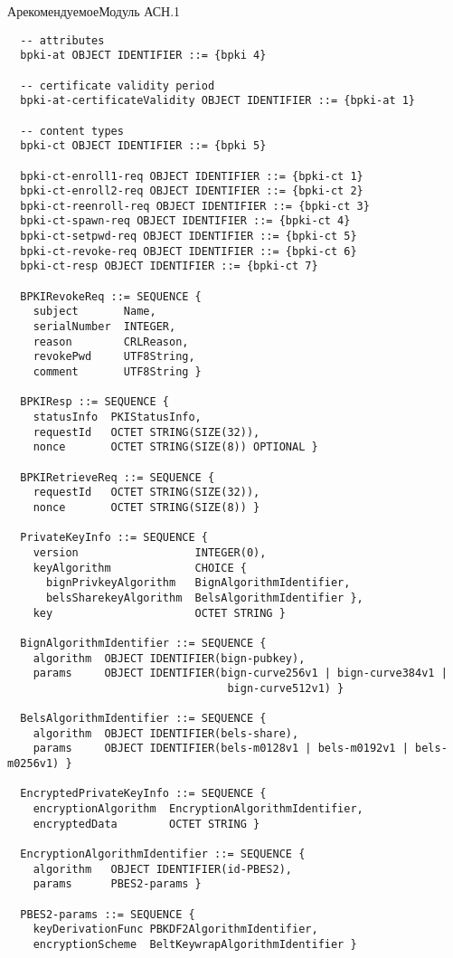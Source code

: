 \begin{appendix}{А}{рекомендуемое}{Модуль АСН.1}
\begin{verbatim}
  -- attributes
  bpki-at OBJECT IDENTIFIER ::= {bpki 4}

  -- certificate validity period
  bpki-at-certificateValidity OBJECT IDENTIFIER ::= {bpki-at 1}

  -- content types
  bpki-сt OBJECT IDENTIFIER ::= {bpki 5}

  bpki-ct-enroll1-req OBJECT IDENTIFIER ::= {bpki-ct 1}
  bpki-ct-enroll2-req OBJECT IDENTIFIER ::= {bpki-ct 2}
  bpki-ct-reenroll-req OBJECT IDENTIFIER ::= {bpki-ct 3}
  bpki-ct-spawn-req OBJECT IDENTIFIER ::= {bpki-ct 4}
  bpki-ct-setpwd-req OBJECT IDENTIFIER ::= {bpki-ct 5}
  bpki-ct-revoke-req OBJECT IDENTIFIER ::= {bpki-ct 6}
  bpki-ct-resp OBJECT IDENTIFIER ::= {bpki-ct 7}

  BPKIRevokeReq ::= SEQUENCE {
    subject       Name,
    serialNumber  INTEGER,
    reason        CRLReason,
    revokePwd     UTF8String,
    comment       UTF8String }

  BPKIResp ::= SEQUENCE { 
    statusInfo  PKIStatusInfo,
    requestId   OCTET STRING(SIZE(32)),
    nonce       OCTET STRING(SIZE(8)) OPTIONAL }

  BPKIRetrieveReq ::= SEQUENCE {
    requestId   OCTET STRING(SIZE(32)),
    nonce       OCTET STRING(SIZE(8)) }

  PrivateKeyInfo ::= SEQUENCE {
    version                  INTEGER(0),
    keyAlgorithm             CHOICE {
      bignPrivkeyAlgorithm   BignAlgorithmIdentifier,
      belsSharekeyAlgorithm  BelsAlgorithmIdentifier },
    key                      OCTET STRING }
  
  BignAlgorithmIdentifier ::= SEQUENCE {
    algorithm  OBJECT IDENTIFIER(bign-pubkey),
    params     OBJECT IDENTIFIER(bign-curve256v1 | bign-curve384v1 | 
                                  bign-curve512v1) }
  
  BelsAlgorithmIdentifier ::= SEQUENCE {
    algorithm  OBJECT IDENTIFIER(bels-share),
    params     OBJECT IDENTIFIER(bels-m0128v1 | bels-m0192v1 | bels-m0256v1) }

  EncryptedPrivateKeyInfo ::= SEQUENCE {
    encryptionAlgorithm  EncryptionAlgorithmIdentifier,
    encryptedData        OCTET STRING }
  
  EncryptionAlgorithmIdentifier ::= SEQUENCE {
    algorithm   OBJECT IDENTIFIER(id-PBES2),
    params      PBES2-params }
  
  PBES2-params ::= SEQUENCE {
    keyDerivationFunc PBKDF2AlgorithmIdentifier,
    encryptionScheme  BeltKeywrapAlgorithmIdentifier }
  

\end{verbatim}
\end{appendix}
